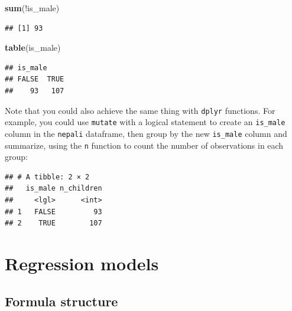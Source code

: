 \documentclass[]{book}
\makeatletter
\newenvironment{Shaded}{\begin{snugshade}}{\end{snugshade}}
\newcommand{\KeywordTok}[1]{\textcolor[rgb]{0.13,0.29,0.53}{\textbf{{#1}}}}
\newcommand{\DataTypeTok}[1]{\textcolor[rgb]{0.13,0.29,0.53}{{#1}}}
\newcommand{\StringTok}[1]{\textcolor[rgb]{0.31,0.60,0.02}{{#1}}}
\newcommand{\NormalTok}[1]{{#1}}
\newenvironment{kframe}{%
\medskip{}
\setlength{\fboxsep}{.8em}
 \def\at@end@of@kframe{}%
 \ifinner\ifhmode%
  \def\at@end@of@kframe{\end{minipage}}%
  \begin{minipage}{\columnwidth}%
 \fi\fi%
 \def\FrameCommand##1{\hskip\@totalleftmargin \hskip-\fboxsep
 \colorbox{shadecolor}{##1}\hskip-\fboxsep
     \hskip-\linewidth \hskip-\@totalleftmargin \hskip\columnwidth}%
 \MakeFramed {\advance\hsize-\width
   \@totalleftmargin\z@ \linewidth\hsize
   \@setminipage}}%
 {\par\unskip\endMakeFramed%
 \at@end@of@kframe}
\renewenvironment{Shaded}{\begin{kframe}}{\end{kframe}}
\makeatother
\begin{document}
\begin{Shaded}
\begin{Highlighting}[]
\KeywordTok{sum}\NormalTok{(!is_male)}
\end{Highlighting}
\end{Shaded}

\begin{verbatim}
## [1] 93
\end{verbatim}

\begin{Shaded}
\begin{Highlighting}[]
\KeywordTok{table}\NormalTok{(is_male)}
\end{Highlighting}
\end{Shaded}

\begin{verbatim}
## is_male
## FALSE  TRUE 
##    93   107
\end{verbatim}

Note that you could also achieve the same thing with \texttt{dplyr}
functions. For example, you could use \texttt{mutate} with a logical
statement to create an \texttt{is\_male} column in the \texttt{nepali}
dataframe, then group by the new \texttt{is\_male} column and summarize,
using the \texttt{n} function to count the number of observations in
each group:

\begin{Shaded}
\end{Shaded}

\begin{verbatim}
## # A tibble: 2 × 2
##   is_male n_children
##     <lgl>      <int>
## 1   FALSE         93
## 2    TRUE        107
\end{verbatim}

\section{Regression models}\label{regression-models}

\subsection{Formula structure}\label{formula-structure}
\end{document}
